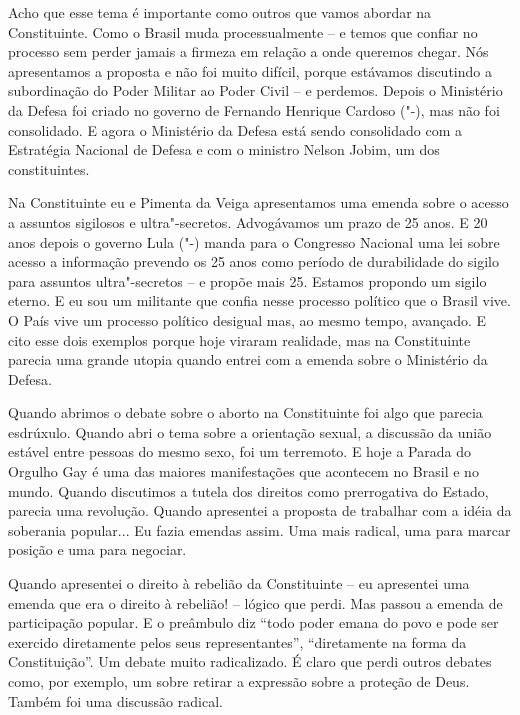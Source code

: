 Acho que esse tema é importante como outros que vamos
abordar na Constituinte. Como o Brasil muda processualmente -- e temos
que confiar no processo sem perder jamais a firmeza em relação a onde
queremos chegar. Nós apresentamos a proposta e não foi muito difícil,
porque estávamos discutindo a subordinação do Poder Militar ao Poder
Civil -- e perdemos. Depois o Ministério da Defesa foi criado no governo
de Fernando Henrique Cardoso ("-), mas não foi consolidado. E agora
o Ministério da Defesa está sendo consolidado com a Estratégia Nacional
de Defesa e com o ministro Nelson Jobim, um dos constituintes.

Na Constituinte eu e Pimenta da Veiga apresentamos uma emenda sobre o
acesso a assuntos sigilosos e ultra"-secretos. Advogávamos um prazo de 25
anos. E 20 anos depois o governo Lula ("-) manda para o Congresso
Nacional uma lei sobre acesso a informação prevendo os 25 anos como
período de durabilidade do sigilo para assuntos ultra"-secretos -- e
propõe mais 25. Estamos propondo um sigilo eterno. E eu sou um militante
que confia nesse processo político que o Brasil vive. O País vive um
processo político desigual mas, ao mesmo tempo, avançado. E cito esse
dois exemplos porque hoje viraram realidade, mas na Constituinte parecia
uma grande utopia quando entrei com a emenda sobre o Ministério da
Defesa.

Quando abrimos o debate sobre o aborto na Constituinte foi algo que
parecia esdrúxulo. Quando abri o tema sobre a orientação sexual, a
discussão da união estável entre pessoas do mesmo sexo, foi um
terremoto. E hoje a Parada do Orgulho Gay é uma das maiores
manifestações que acontecem no Brasil e no mundo. Quando discutimos a
tutela dos direitos como prerrogativa do Estado, parecia uma revolução.
Quando apresentei a proposta de trabalhar com a idéia da soberania
popular... Eu fazia emendas assim. Uma mais radical, uma para marcar
posição e uma para negociar.

Quando apresentei o direito à rebelião da Constituinte -- eu apresentei
uma emenda que era o direito à rebelião! -- lógico que perdi. Mas passou
a emenda de participação popular. E o preâmbulo diz ``todo poder emana
do povo e pode ser exercido diretamente pelos seus representantes'',
``diretamente na forma da Constituição''. Um debate muito radicalizado.
É claro que perdi outros debates como, por exemplo, um sobre retirar a
expressão sobre a proteção de Deus. Também foi uma discussão radical.

